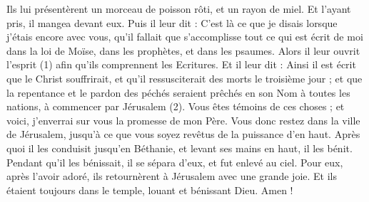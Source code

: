 \begin{multicols}{2}
Ils lui présentèrent un morceau de poisson rôti, et un rayon de miel.
Et l'ayant pris, il mangea devant eux.
Puis il leur dit : C’est là ce que je disais lorsque j’étais encore avec vous, qu’il fallait que s’accomplisse tout ce qui est écrit de moi dans la loi de Moïse, dans les prophètes, et dans les psaumes.
Alors il leur ouvrit l'esprit (1) afin qu’ils comprennent les Ecritures.
Et il leur dit : Ainsi il est écrit que le Christ souffrirait, et qu'il ressusciterait des morts le troisième jour ;
et que la repentance et le pardon des péchés seraient prêchés en son Nom à toutes les nations, à commencer par Jérusalem (2).
Vous êtes témoins de ces choses ; et voici, j’enverrai sur vous la promesse de mon Père.
Vous donc restez dans la ville de Jérusalem, jusqu'à ce que vous soyez revêtus de la puissance d'en haut.
Après quoi il les conduisit jusqu'en Béthanie, et levant ses mains en haut, il les bénit.
Pendant qu’il les bénissait, il se sépara d'eux, et fut enlevé au ciel.
Pour eux, après l’avoir adoré, ils retournèrent à Jérusalem avec une grande joie.
Et ils étaient toujours dans le temple, louant et bénissant Dieu. Amen !
\PPE{}
\end{multicols}
